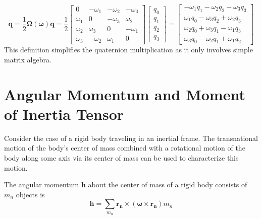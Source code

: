 \begin{equation}
    \dot{\mathbf{q}}=\frac{1}{2} \boldsymbol{\Omega}(\boldsymbol{\omega}) \mathbf{q}=\frac{1}{2}\left[\begin{array}{cccc}
    0 & -\omega_{1} & -\omega_{2} & -\omega_{3} \\
    \omega_{1} & 0 & -\omega_{3} & \omega_{2} \\
    \omega_{2} & \omega_{3} & 0 & -\omega_{1} \\
    \omega_{3} & -\omega_{2} & \omega_{1} & 0
    \end{array}\right]\left[\begin{array}{l}
    q_{0} \\
    q_{1} \\
    q_{2} \\
    q_{3}
    \end{array}\right]=\left[\begin{array}{c}
    -\omega_{1} q_{1}-\omega_{2} q_{2}-\omega_{3} q_{3} \\
    \omega_{1} q_{0}-\omega_{3} q_{2}+\omega_{2} q_{3} \\
    \omega_{2} q_{0}+\omega_{3} q_{1}-\omega_{1} q_{3} \\
    \omega_{3} q_{0}-\omega_{2} q_{1}+\omega_{1} q_{2}
    \end{array}\right]
\end{equation}
This definition simplifies the quaternion multiplication as it only involves simple matrix algebra. 
\section{Angular Momentum and Moment of Inertia Tensor}
Consider the case of a rigid body traveling in an inertial frame. The transnational motion of the body's center of mass combined with a rotational motion of the body along some axis via its center of mass can be used to characterize this motion.

The angular momentum $\boldsymbol{h}$ about the center of mass of a rigid body consists of $m_{n}$ objects is
\begin{equation}
\boldsymbol{h}=\sum_{m_{n}} \boldsymbol{r}_{\boldsymbol{n}} \times\left(\boldsymbol{\omega} \times \boldsymbol{r}_{\boldsymbol{n}}\right) m_{n}    
\end{equation}

